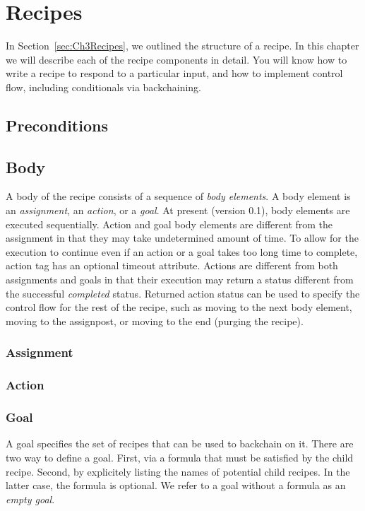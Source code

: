 \chapter{Recipes}
\label{Chapter4}

In Section~\ref{sec:Ch3Recipes}, we outlined the structure of a recipe. In this chapter we will describe each of the recipe components in detail. You will know how to write a recipe to respond to a particular input, and how to implement control flow, including conditionals via backchaining.



\section{Preconditions}
\section{Body}

A body of the recipe consists of a sequence of \textsl{body elements}. A body element is an \textsl{assignment}, an \textsl{action}, or a \textsl{goal}. At present (version 0.1), body elements are executed sequentially. Action and goal body elements are different from the assignment in that they may take undetermined amount of time. To allow for the execution to continue even if an action or a goal takes too long time to complete, action tag has an optional timeout attribute. Actions are different from both assignments and goals in that their execution may return a status different from the successful \textsl{completed} status. Returned action status can be used to specify the control flow for the rest of the recipe, such as moving to the next body element, moving to the assignpost, or moving to the end (purging the recipe).

\subsection{Assignment}
\subsection{Action}
\subsection{Goal}

A goal specifies the set of recipes that can be used to backchain on it. There are two way to define a goal. First, via a formula that must be satisfied by the child recipe. Second, by explicitely listing the names of potential child recipes. In the latter case, the formula is optional. We refer to a goal without a formula as an \textsl{empty goal}.

